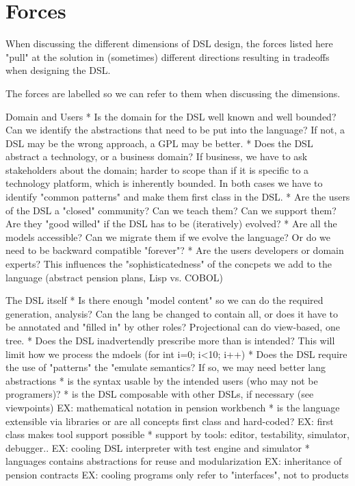 \documentclass[submission,copyright,creativecommons]{eptcs}
\begin{document}
	
\section{Forces}

	When discussing the different dimensions of DSL design, the forces
	listed here "pull" at the solution in (sometimes) different directions
	resulting in tradeoffs when designing the DSL.
	
	The forces are labelled so we can refer to them when discussing
	the dimensions.

    Domain and Users
	* Is the domain for the DSL well known and well bounded? Can we
	  identify the abstractions that need to be put into the language?
	  If not, a DSL may be the wrong approach, a GPL may be better.
	* Does the DSL abstract a technology, or a business domain?
	  If business, we have to ask stakeholders about the domain; harder
	  to scope than if it is specific to a technology platform, which is
	  inherently bounded. In both cases we have to identify "common patterns"
	  and make them first class in the DSL.
	* Are the users of the DSL a "closed" community? Can we teach them?
	  Can we support them? Are they "good willed" if the DSL has to be 
	  (iteratively) evolved?
	* Are all the models accessible? Can we migrate them if we evolve the
	  language? Or do we need to be backward compatible "forever"?
	* Are the users developers or domain experts? This influences the
	  "sophisticatedness" of the concpets we add to the language 
	  (abstract pension plans, Lisp vs. COBOL)
	  
	The DSL itself
	* Is there enough "model content" so we can do the required
	  generation, analysis? Can the lang be changed to contain all,
	  or does it have to be annotated and "filled in" by other 
	  roles? Projectional can do view-based, one tree.
  	* Does the DSL inadvertendly prescribe more than is intended? 
  	  This will limit how we process the mdoels (for int i=0; i<10; i++)
  	* Does the DSL require the use of "patterns" the "emulate
  	  semantics? If so, we may need better lang abstractions
    * is the syntax usable by the intended users (who may 
      not be programers)? 
  	* is the DSL composable with other DSLs, if necessary
  	  (see viewpoints)
	  EX: mathematical notation in pension workbench
	* is the language extensible via libraries or are
	  all concepts first class and hard-coded?
	  EX: first class makes tool support possible
	* support by tools: editor, testability, simulator, debugger..
	  EX: cooling DSL interpreter with test engine and simulator
    * languages contains abstractions for reuse and modularization
 	  EX: inheritance of pension contracts
 	  EX: cooling programs only refer to "interfaces", not to products
\end{document}
